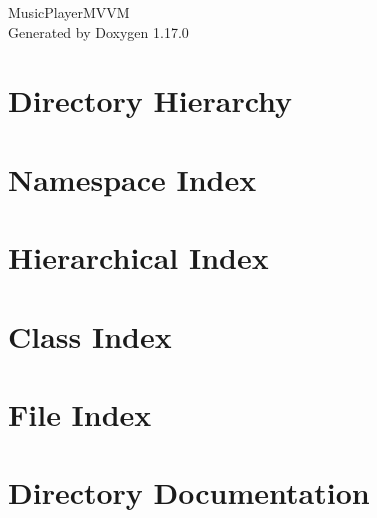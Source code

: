 \documentclass[twoside]{book}
\newcommand{\+}{\discretionary{\mbox{\scriptsize$\hookleftarrow$}}{}{}}
\newcommand{\clearemptydoublepage}{%
    \newpage{\pagestyle{empty}\cleardoublepage}%
  }
\begin{document}
  \raggedbottom
    \hypersetup{pageanchor=false,
                bookmarksnumbered=true,
                pdfencoding=unicode
               }
  \begin{titlepage}
  \vspace*{7cm}
  \begin{center}%
  {\Large Music\+Player\+MVVM}\\
  \vspace*{1cm}
  {\large Generated by Doxygen 1.17.0}\\
  \end{center}
  \end{titlepage}
  \clearemptydoublepage
  \tableofcontents
  \clearemptydoublepage
  \hypersetup{pageanchor=true}



\chapter{Directory Hierarchy}

\chapter{Namespace Index}

\chapter{Hierarchical Index}

\chapter{Class Index}

\chapter{File Index}

\chapter{Directory Documentation}




















\end{document}

